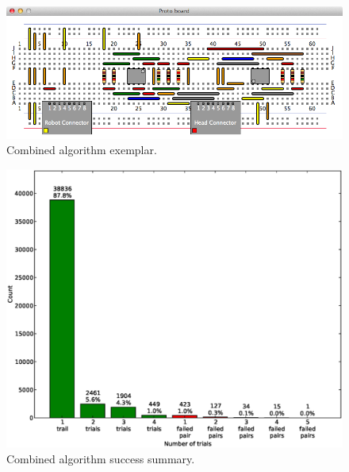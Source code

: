 \begin{figure}[H]
\begin{center}
\includegraphics[width=\textwidth]{Images/exemplar_combined_algorithm.png}
\caption[Combined algorithm exemplar]{Combined algorithm exemplar.}
\end{center}
\end{figure}

\begin{figure}[H]
\begin{center}
\includegraphics[width=\textwidth]{Images/final_algorithm_num_trials.eps}
\caption[Combined algorithm success summary]{Combined algorithm success summary.}
\label{fig:final_num_trials}
\end{center}
\end{figure}

